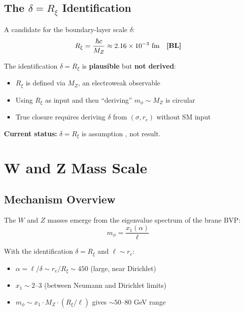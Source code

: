 \subsection{The $\delta = R_\xi$ Identification}

A candidate for the boundary-layer scale $\delta$:
\begin{equation}
R_\xi = \frac{\hbar c}{M_Z} \approx 2.16 \times 10^{-3} \text{ fm} \quad \textbf{[BL]}{}
\label{eq:Rxi}
\end{equation}

\begin{tcolorbox}[colback=yellow!5!white, colframe=yellow!50!black,
    title=\textbf{Warning: Identification vs Derivation}]
The identification $\delta = R_\xi$ is \textbf{plausible} but \textbf{not derived}:
\begin{itemize}[nosep]
\item $R_\xi$ is defined via $M_Z$, an electroweak observable \tagBL{}
\item Using $R_\xi$ as input and then ``deriving'' $m_\phi \sim M_Z$ is circular
\item True closure requires deriving $\delta$ from $(\sigma, r_e)$ without SM input
\end{itemize}

\textbf{Current status:} $\delta = R_\xi$ is assumption \tagP{}, not result.
\end{tcolorbox}

\section{W and Z Mass Scale}
\label{sec:wz_masses}

\subsection{Mechanism Overview}

The $W$ and $Z$ masses emerge from the eigenvalue spectrum of the brane BVP:
\begin{equation}
m_\phi = \frac{x_1(\alpha)}{\ell}
\label{eq:mphi}
\end{equation}

With the identification $\delta = R_\xi$ and $\ell \sim r_e$:
\begin{itemize}[nosep]
\item $\alpha = \ell/\delta \sim r_e/R_\xi \sim 450$ (large, near Dirichlet)
\item $x_1 \sim 2$--$3$ (between Neumann and Dirichlet limits)
\item $m_\phi \sim x_1 \cdot M_Z \cdot (R_\xi/\ell)$ gives $\sim 50$--$80$ GeV range
\end{itemize}

